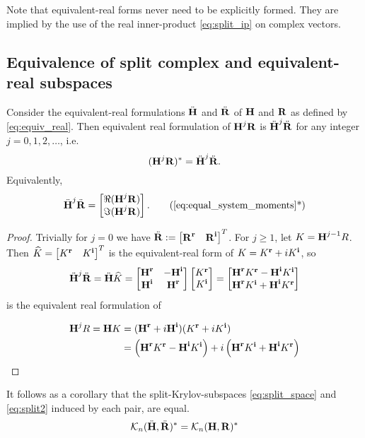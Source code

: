 Note  that equivalent-real forms never need to be explicitly formed. They are implied by the use of the real inner-product \eqref{eq:split_ip} on complex vectors. 

\subsection{Equivalence of split complex and equivalent-real subspaces}
\label{sec:equivbases}
\begin{lemma}\label{lem:equal_system_moments}
Consider the equivalent-real formulations $\Heq$ and $\Req$ of $\H$ and $\RR$ as defined by \eqref{eq:equiv_real}.  
Then equivalent real formulation of $\H^j \RR$ is $\Heq^j \Req$ for any integer $j=0,1,2,\ldots$, i.e.
\begin{equation}
   (\H^j \RR)^* =   \Heq^j \Req.
\label{eq:equal_system_moments}
\end{equation}
Equivalently,
\begin{equation}
\Heq^j \Req = \mat{\Re(\H^j \RR) \\ \Im(\H^j \RR)}.
\tag{\ref{eq:equal_system_moments}*}
\end{equation}
\end{lemma}

\begin{proof}
Trivially for $j=0$ we have $\Req := \mat{\rp{\RR}{} & \ip{\RR}{}}^T$.
For $j\geq 1$, let $K = \H^{j-1} R$. Then $\Keq = \mat{\rp{K}{}& \ip{K}{}}^T$
is the equivalent-real form of $K = \rp{K}{} + i \ip{K}{}$, so
 \begin{equation*}
 \Heq^j \Req  = \Heq\Keq = \mat{\rp{\H}{} & -\ip{\H}{}\\ \ip{\H}{} & \rp{\H}{}} \mat{\rp{K}{} \\ \ip{K}{}}
 = \mat{\rp{\H}{} \rp{K}{} - \ip{\H}{} \ip{K}{} \\ \rp{\H}{}\ip{K}{} + \ip{\H}{}\rp{K}{} }
 \end{equation*}
is the equivalent real formulation of

\begin{align*}
\H^j R = \H K &= (\rp{\H}{} + i \ip{\H}{})(\rp{K}{} + i\ip{K}{})\\
 &= \left( \rp{\H}{}\rp{K}{} - \ip{\H}{}\ip{K}{} \right) +
	i\left(\rp{\H}{}\ip{K}{} + \ip{\H}{}\rp{K}{}  \right)
\end{align*}
\end{proof}


It follows as a corollary that the split-Krylov-subspaces  \eqref{eq:split_space} and \eqref{eq:split2}  induced by each pair, are equal.
\begin{equation}
	   	\krylov{n}{\Heq}{\Req}^* = \krylov{n}{\H}{\RR}^*
\label{eq:split_bases_equiv}
\end{equation}



